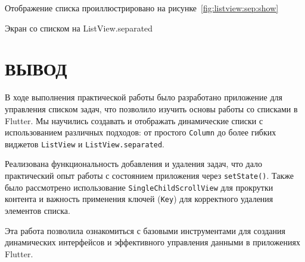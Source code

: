 Отображение списка проиллюстрировано на рисунке~\ref{fig:listview:sep:show}

\begin{image}
	\caption{Экран со списком на ListView.separated}
	\label{fig:listview:sep:show}
\end{image}


\clearpage

\section*{ВЫВОД}

В ходе выполнения практической работы было разработано приложение
для управления списком задач,
что позволило изучить основы работы со списками в Flutter.
Мы научились создавать и отображать динамические списки
с использованием различных подходов:
от простого \texttt{Column} до более гибких виджетов \texttt{ListView} 
и \texttt{ListView.separated}. 

Реализована функциональность добавления и удаления задач,
что дало практический опыт работы с состоянием приложения
через \texttt{setState()}.
Также было рассмотрено использование \texttt{SingleChildScrollView} 
для прокрутки контента и важность применения ключей (\texttt{Key})
для корректного удаления элементов списка.

Эта работа позволила ознакомиться с базовыми инструментами
для создания динамических интерфейсов
и эффективного управления данными в приложениях Flutter.

